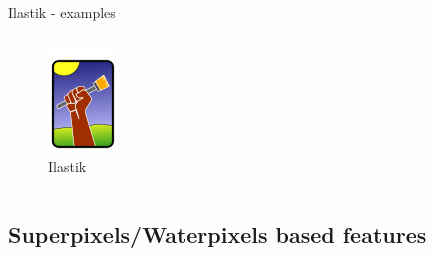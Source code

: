 \documentclass{beamer}
\begin{document}
\begin{frame}{Ilastik - examples}
\begin{columns}[T]
\begin{column}{.2\textwidth}
\begin{figure}[!ht]
\includegraphics[width=\textwidth]{Ilastik.png}
\caption{Ilastik}
\label{}
\end{figure}
\end{column}%
\end{columns}
\end{frame}

\subsection{Superpixels/Waterpixels based features}
\end{document}
